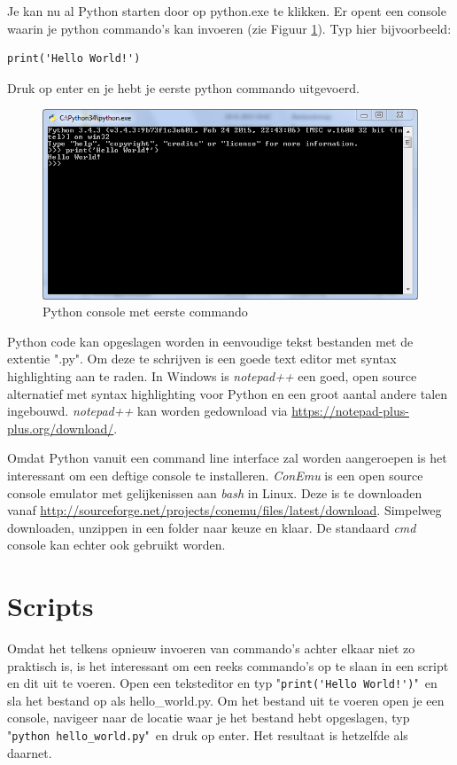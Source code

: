 \documentclass[11pt,twoside]{article}
\begin{document}
Je kan nu al Python starten door op python.exe te klikken. Er opent een console waarin je python commando's kan invoeren (zie Figuur \ref{fig:Python34}). Typ hier bijvoorbeeld:
\begin{lstlisting}
print('Hello World!')
\end{lstlisting}

Druk op enter en je hebt je eerste python commando uitgevoerd.
\begin{figure}[ht]
	\centering
	\includegraphics[scale=0.5]{fig/Python34}
	\caption{Python console met eerste commando}
	\label{fig:Python34}
\end{figure}

Python code kan opgeslagen worden in eenvoudige tekst bestanden met de extentie "\textsf{.py}". Om deze te schrijven is een goede text editor met syntax highlighting aan te raden. In Windows is \emph{notepad++} een goed, open source alternatief met syntax highlighting voor Python en een groot aantal andere talen ingebouwd. \emph{notepad++} kan worden gedownload via \url{https://notepad-plus-plus.org/download/}.

Omdat Python vanuit een command line interface zal worden aangeroepen is het interessant om een deftige console te installeren. \emph{ConEmu} is een open source console emulator met gelijkenissen aan \emph{bash} in Linux. Deze is te downloaden vanaf \url{http://sourceforge.net/projects/conemu/files/latest/download}. Simpelweg downloaden, unzippen in een folder naar keuze en klaar. De standaard \emph{cmd} console kan echter ook gebruikt worden.

 	\section{Scripts}
Omdat het telkens opnieuw invoeren van commando's achter elkaar niet zo praktisch is, is het interessant om een reeks commando's op te slaan in een script en dit uit te voeren. Open een teksteditor en typ "\lstinline{print('Hello World!')}"\ en sla het bestand op als \textsf{hello\_world.py}. Om het bestand uit te voeren open je een console, navigeer naar de locatie waar je het bestand hebt opgeslagen, typ "\lstinline[language=bash]{python hello_world.py}"\ en druk op enter. Het resultaat is hetzelfde als daarnet.
\end{document}
